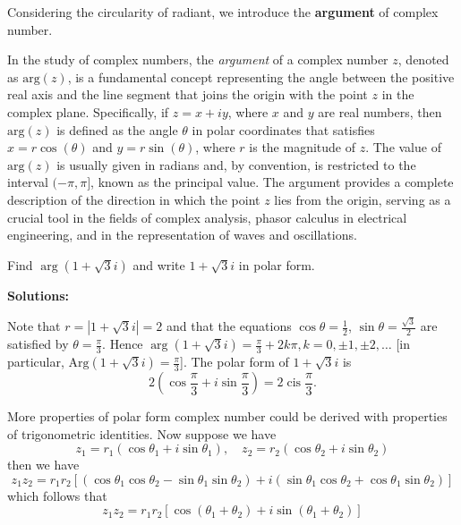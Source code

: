 \documentclass[
	12pt, %
	fleqn, %
	a4paper, %
]{LegrandOrangeBook}
\begin{document}
Considering the circularity of radiant, we introduce the \textbf{argument} of complex number.
\begin{definition}
In the study of complex numbers, the \emph{argument} of a complex number \( z \), denoted as \( \text{arg}(z) \), is a fundamental concept representing the angle between the positive real axis and the line segment that joins the origin with the point \( z \) in the complex plane. Specifically, if \( z = x + iy \), where \( x \) and \( y \) are real numbers, then \( \text{arg}(z) \) is defined as the angle \( \theta \) in polar coordinates that satisfies \( x = r\cos(\theta) \) and \( y = r\sin(\theta) \), where \( r \) is the magnitude of \( z \). The value of \( \text{arg}(z) \) is usually given in radians and, by convention, is restricted to the interval \( (-\pi, \pi] \), known as the principal value. The argument provides a complete description of the direction in which the point \( z \) lies from the origin, serving as a crucial tool in the fields of complex analysis, phasor calculus in electrical engineering, and in the representation of waves and oscillations.
\end{definition}

\begin{example}
    Find $\arg(1 + \sqrt{3}i)$ and write $1 + \sqrt{3}i$ in polar form.
\end{example}
\textbf{Solutions:}

Note that $r = |1 + \sqrt{3}i| = 2$ and that the equations $\cos\theta = \frac{1}{2}$, $\sin\theta = \frac{\sqrt{3}}{2}$ are satisfied by $\theta = \frac{\pi}{3}$. Hence $\arg(1 + \sqrt{3}i) = \frac{\pi}{3} + 2k\pi, k = 0, \pm1, \pm2, \ldots$ [in particular, $\text{Arg}(1 + \sqrt{3}i) = \frac{\pi}{3}$]. The polar form of $1 + \sqrt{3}i$ is
\[2(\cos\frac{\pi}{3} + i\sin\frac{\pi}{3}) = 2\operatorname{cis}\frac{\pi}{3}.\]

More properties of polar form complex number could be derived with properties of trigonometric identities.
Now suppose we have 
$$z_1=r_1\left(\cos\theta_1+i\sin\theta_1\right),\quad z_2=r_2\left(\cos\theta_2+i\sin\theta_2\right)$$
then we have
$$z_1z_2=r_1r_2\left[(\cos\theta_1\cos\theta_2-\sin\theta_1\sin\theta_2)+i(\sin\theta_1\cos\theta_2+\cos\theta_1\sin\theta_2)\right]$$
which follows that
\begin{equation} \label{polarprod}
    z_1z_2=r_1r_2\left[\cos\left(\theta_1+\theta_2\right)+i\sin\left(\theta_1+\theta_2\right)\right]
\end{equation}
\end{document}
